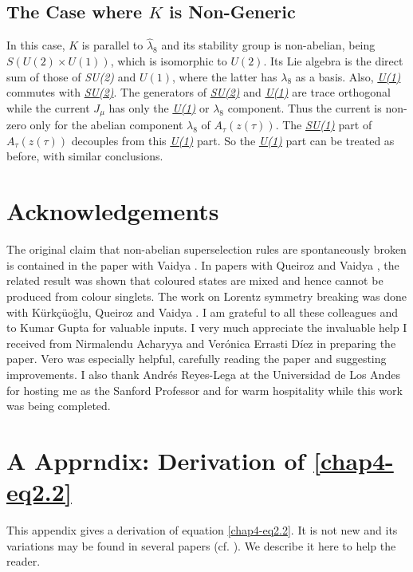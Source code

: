 \subsection{The Case where $K$ is Non-Generic}\label{chap4-sec4.1}

In this case, $K$ is parallel to $\hat{\lambda}_8$ and its stability group is non-abelian, being $S(U(2) \times U(1))$, which is isomorphic to $U(2)$. Its Lie algebra is the direct sum of those of \textit{SU(2)} and $U(1)$, where the latter has $\lambda_8$ as a basis. Also, \ul{\textit{U(1)}} commutes with \ul{\textit{SU(2)}}. The generators of \ul{\textit{SU(2)}} and \ul{\textit{U(1)}} are trace orthogonal while the current $J_\mu$ has only the \ul{\textit{U(1)}} or $\lambda_8$ component. Thus the current is non-zero only for the abelian component $\lambda_8$ of $A_\tau(z (\tau))$. The \ul{\textit{SU(1)}} part of $A_\tau (z(\tau))$ decouples from this \ul{\textit{U(1)}} part. So the \ul{\textit{U(1)}} part can be treated as before, with similar conclusions.

\section*{Acknowledgements}

The original claim that non-abelian superselection rules are spontaneously broken is contained in the paper with Vaidya \cite{chap4-key1}. In papers with Queiroz and Vaidya \cite{chap4-key10, chap4-key13}, the related result was shown that coloured states are mixed and hence cannot be produced from colour singlets. The work on Lorentz symmetry breaking was done with K\"urk\c{c}\"{u}o\u{g}lu, Queiroz and Vaidya \cite{chap4-key4}. I am grateful to all these colleagues and to Kumar Gupta for valuable inputs. I very much appreciate the invaluable help I received from Nirmalendu Acharyya and Ver\'onica Errasti D\'iez in preparing the paper. Vero was especially helpful, carefully reading the paper and suggesting improvements. I also thank Andr\'es Reyes-Lega at the Universidad de Los Andes for hosting me as the Sanford Professor and for warm hospitality while this work was being completed.


\section*{A Apprndix: Derivation of \eqref{chap4-eq2.2}}

This appendix gives a derivation of equation \eqref{chap4-eq2.2}. It is not new and its variations may be found in several papers (cf. \cite{chap4-key3, chap4-key6, chap4-key14}). We describe it here to help the reader.


